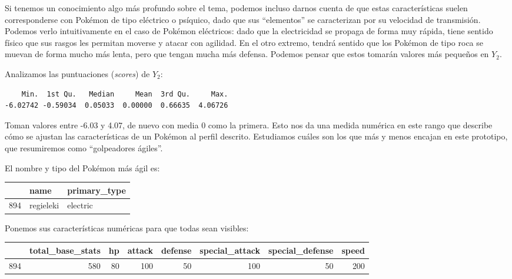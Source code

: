 \documentclass[
  12pt,
]{extreport}
\begin{document}
Si tenemos un conocimiento algo más profundo sobre el tema, podemos
incluso darnos cuenta de que estas características suelen corresponderse
con Pokémon de tipo eléctrico o psíquico, dado que sus ``elementos'' se
caracterizan por su velocidad de transmisión. Podemos verlo
intuitivamente en el caso de Pokémon eléctricos: dado que la
electricidad se propaga de forma muy rápida, tiene sentido físico que
sus rasgos les permitan moverse y atacar con agilidad. En el otro
extremo, tendrá sentido que los Pokémon de tipo roca se muevan de forma
mucho más lenta, pero que tengan mucha más defensa. Podemos pensar que
estos tomarán valores más pequeños en \(Y_2\).

Analizamos las puntuaciones (\emph{scores}) de \(Y_2\):

\begin{verbatim}
    Min.  1st Qu.   Median     Mean  3rd Qu.     Max. 
-6.02742 -0.59034  0.05033  0.00000  0.66635  4.06726 
\end{verbatim}

Toman valores entre -6.03 y 4.07, de nuevo con media 0 como la primera.
Esto nos da una medida numérica en este rango que describe cómo se
ajustan las características de un Pokémon al perfil descrito. Estudiamos
cuáles son los que más y menos encajan en este prototipo, que
resumiremos como ``golpeadores ágiles''.

El nombre y tipo del Pokémon más ágil es:

\begin{table}[H]
\centering\begingroup\fontsize{10.5}{12.5}\selectfont

\begin{tabular}{lll}
\toprule
  & name & primary\_type\\
\midrule
894 & regieleki & electric\\
\bottomrule
\end{tabular}
\endgroup{}
\end{table}

Ponemos sus características numéricas para que todas sean visibles:

\begin{table}[H]
\centering\begingroup\fontsize{9.5}{11.5}\selectfont

\begin{tabular}{lrrrrrrr}
\toprule
  & total\_base\_stats & hp & attack & defense & special\_attack & special\_defense & speed\\
\midrule
894 & 580 & 80 & 100 & 50 & 100 & 50 & 200\\
\bottomrule
\end{tabular}
\endgroup{}
\end{table}
\end{document}
